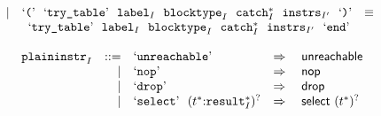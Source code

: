 $$\begin{array}[t]{@{}lrrl@{}l@{}l@{}l@{}}
{\begin{array}[t]{@{}l@{}}
\end{array}
} \\
& & | & \mbox{‘\texttt{{(}}’}~~\mbox{‘\texttt{try\_table}’}~~{{\mathtt{label}}}_{I}~~{{\mathtt{blocktype}}}_{I}~~{{{\mathtt{catch}}}_{I}^\ast}~~{{\mathtt{instrs}}}_{{I'}}~~\mbox{‘\texttt{{)}}’} & \quad\equiv\quad{} & & \\
&&& \multicolumn{4}{@{}l@{}}{\quad
\begin{array}[t]{@{}l@{}}
\mbox{‘\texttt{try\_table}’}~~{{\mathtt{label}}}_{I}~~{{\mathtt{blocktype}}}_{I}~~{{{\mathtt{catch}}}_{I}^\ast}~~{{\mathtt{instrs}}}_{{I'}}~~\mbox{‘\texttt{end}’} \\
\end{array}
} \\
\end{array}
$$

\vspace{1ex}

$$
\begin{array}[t]{@{}lrrl@{}l@{}l@{}l@{}}
& {{\mathtt{plaininstr}}}_{I} & ::= & \mbox{‘\texttt{unreachable}’} & \quad\Rightarrow\quad{} & \mathsf{unreachable} \\
& & | & \mbox{‘\texttt{nop}’} & \quad\Rightarrow\quad{} & \mathsf{nop} \\
& & | & \mbox{‘\texttt{drop}’} & \quad\Rightarrow\quad{} & \mathsf{drop} \\
& & | & \mbox{‘\texttt{select}’}~~{({t^\ast}{:}{{{\mathtt{result}}}_{I}^\ast})^?} & \quad\Rightarrow\quad{} & \mathsf{select}~{({t^\ast})^?} \\
\end{array}
$$

\vspace{1ex}

